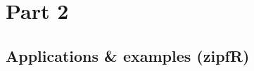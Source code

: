 \documentclass[handout,notes=show,t]{beamer} %
\begin{document}

\begin{frame}[c]
  \begin{center}
  \end{center}
\end{frame}
\hideLogo{}


\section{Part 2}


\subsection{Applications \& examples (zipfR)}
\end{document}
